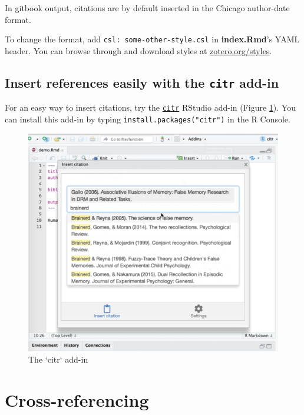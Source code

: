 \documentclass[a4paper, twoside]{templates/ociamthesis}
\theoremstyle{definition}
\theoremstyle{definition}
\theoremstyle{definition}
\theoremstyle{definition}
\theoremstyle{remark}
\begin{document}
In gitbook output, citations are by default inserted in the Chicago author-date format.

To change the format, add \texttt{csl:\ some-other-style.csl} in \textbf{index.Rmd}'s YAML header.
You can browse through and download styles at \href{https://www.zotero.org/styles}{zotero.org/styles}.

\clearpage

\hypertarget{insert-references-easily-with-the-citr-add-in}{%
\subsection{\texorpdfstring{Insert references easily with the \texttt{citr} add-in}{Insert references easily with the citr add-in}}\label{insert-references-easily-with-the-citr-add-in}}

For an easy way to insert citations, try the \href{https://github.com/crsh/citr}{\texttt{citr}} RStudio add-in (Figure \ref{fig:citr}).
You can install this add-in by typing \texttt{install.packages("citr")} in the R Console.

\begin{figure}

{\centering \includegraphics[width=0.8\linewidth]{figures/sample-content/citr} 

}

\caption{The `citr` add-in}\label{fig:citr}
\end{figure}

\hypertarget{cross-referencing}{%
\section{Cross-referencing}\label{cross-referencing}}
\end{document}
